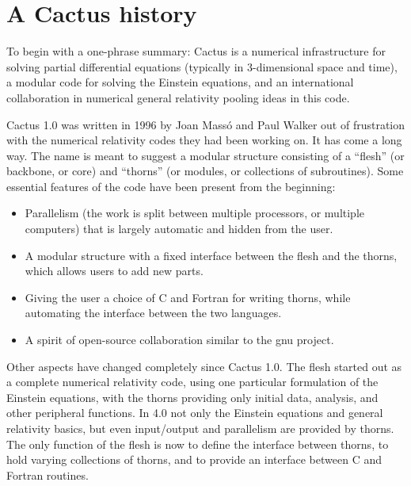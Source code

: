 
\chapter{A Cactus history}

To begin with a one-phrase summary: Cactus is a numerical
infrastructure for solving partial differential equations (typically
in 3-dimensional space and time), a modular code for solving the
Einstein equations, and an international collaboration in numerical
general relativity pooling ideas in this code.

Cactus 1.0 was written in 1996 by Joan Mass\'o and Paul Walker out of
frustration with the numerical relativity codes they had been working
on. It has come a long way. The name is meant to suggest a modular
structure consisting of a ``flesh'' (or backbone, or core) and
``thorns'' (or modules, or collections of subroutines). Some essential
features of the code have been present from the beginning:

\begin{itemize}

\item Parallelism (the work is split between multiple processors, or
multiple computers) that is largely automatic and hidden from the
user.

\item A modular structure with a fixed interface between the flesh and the
thorns, which allows users to add new parts.

\item Giving the user a choice of C and Fortran for writing thorns, while
automating the interface between the two languages.

\item A spirit of open-source collaboration similar to the gnu
project.

\end{itemize}

Other aspects have changed completely since Cactus 1.0. The flesh
started out as a complete numerical relativity code, using one
particular formulation of the Einstein equations, with the thorns
providing only initial data, analysis, and other peripheral
functions. In 4.0 not only the Einstein equations and general
relativity basics, but even input/output and parallelism are provided
by thorns. The only function of the flesh is now to define the
interface between thorns, to hold varying collections of thorns, and
to provide an interface between C and Fortran routines. 

